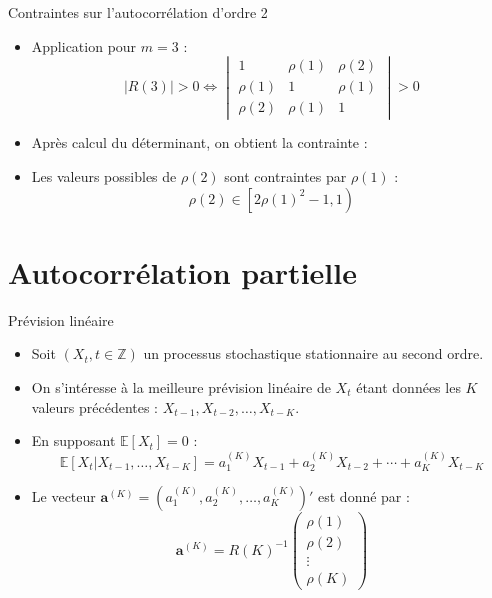\documentclass[11pt,aspectratio=169]{beamer}
\newcommand{\E}{\mathbb{E}}
\newcommand{\Z}{\mathbb{Z}}
\begin{document}
\begin{frame}{Contraintes sur l'autocorrélation d'ordre 2}

\begin{itemize}

\item Application pour $m = 3$ :
  \[
  |R(3)| > 0 \Leftrightarrow \begin{vmatrix} 1 & \rho(1) & \rho(2) \\ \rho(1) & 1 & \rho(1) \\ \rho(2) & \rho(1) & 1 \end{vmatrix} > 0
  \]\newline

\item Après calcul du déterminant, on obtient la contrainte :\newline

\item Les valeurs possibles de $\rho(2)$ sont contraintes par $\rho(1)$ :
  \[
  \rho(2) \in \left[2\rho(1)^2 - 1, 1\right)
  \]

\end{itemize}

\end{frame}

\section{Autocorrélation partielle}

\begin{frame}{Prévision linéaire}

\begin{itemize}

\item Soit $(X_t, t \in \Z)$ un processus stochastique stationnaire au second ordre.\newline

\item On s'intéresse à la meilleure prévision linéaire de $X_t$ étant données les $K$ valeurs précédentes : $X_{t-1}, X_{t-2}, \ldots, X_{t-K}$.\newline

\item En supposant $\E[X_t] = 0$ :
  \[
  \E[X_t | X_{t-1}, \ldots, X_{t-K}] = a_1^{(K)} X_{t-1} + a_2^{(K)} X_{t-2} + \cdots + a_K^{(K)} X_{t-K}
  \]\newline

\item Le vecteur $\mathbf{a}^{(K)} = (a_1^{(K)}, a_2^{(K)}, \ldots, a_K^{(K)})'$ est donné par :
  \[
  \mathbf{a}^{(K)} = R(K)^{-1} \begin{pmatrix} \rho(1) \\ \rho(2) \\ \vdots \\ \rho(K) \end{pmatrix}
  \]

\end{itemize}

\end{frame}
\end{document}
